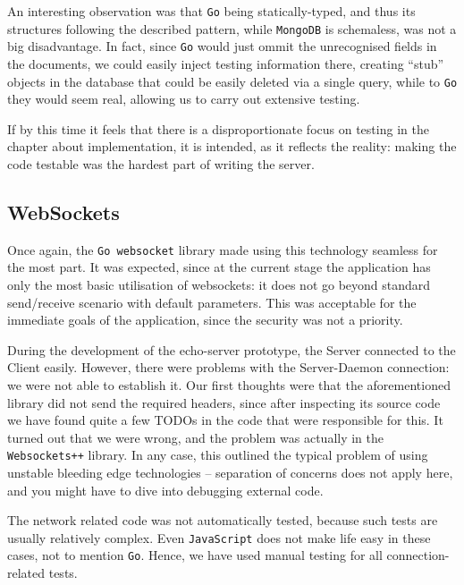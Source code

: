 \documentclass{l3proj}
\begin{document}
An interesting observation was that \texttt{Go} being statically-typed, and thus its structures following the described pattern, while \texttt{MongoDB} is schemaless, was not a big disadvantage. In fact, since \texttt{Go} would just ommit the unrecognised fields in the documents, we could easily inject testing information there, creating ``stub'' objects in the database that could be easily deleted via a single query, while to \texttt{Go} they would seem real, allowing us to carry out extensive testing.

If by this time it feels that there is a disproportionate focus on testing in the chapter about implementation, it is intended, as it reflects the reality: making the code testable was the hardest part of writing the server.

\subsection{WebSockets}

Once again, the \texttt{Go websocket} library made  using this technology seamless for the most part. It was expected, since at the current stage the application has only the most basic utilisation of websockets: it does not go beyond standard send/receive scenario with default parameters. This was acceptable for the immediate goals of the application, since the security was not a priority.

During the development of the echo-server prototype, the Server connected to the Client easily. However, there were problems with the Server-Daemon connection: we were not able to establish it. Our first thoughts were that the aforementioned library did not send the required headers, since after inspecting its source code we have found quite a few TODOs in the code that were responsible for this. It turned out that we were wrong, and the problem was actually in the \texttt{Websockets++} library. In any case, this outlined the typical problem of using unstable bleeding edge technologies -- separation of concerns does not apply here, and you might have to dive into debugging external code.

The network related code was not automatically tested, because such tests are usually relatively complex. Even \texttt{JavaScript} does not make life easy in these cases, not to mention \texttt{Go}. Hence, we have used manual testing for all connection-related tests.

\end{document}
